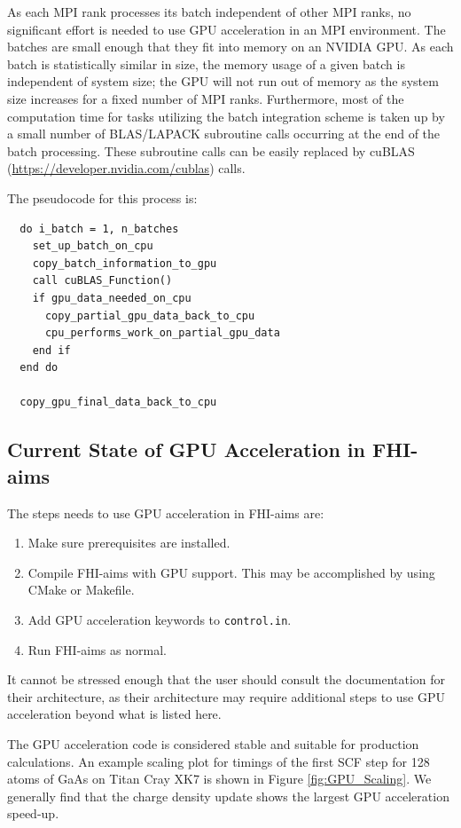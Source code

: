 As each MPI rank processes its batch independent of other MPI ranks, no significant effort is needed to use GPU acceleration in an MPI environment. The batches are small enough that they fit into memory on an NVIDIA GPU. As each batch is statistically similar in size, the memory usage of a given batch is independent of system size; the GPU will not run out of memory as the system size increases for a fixed number of MPI ranks. Furthermore, most of the computation time for tasks utilizing the batch integration scheme is taken up by a small number of BLAS/LAPACK subroutine calls occurring at the end of the batch processing. These subroutine calls can be easily replaced by cuBLAS (\url{https://developer.nvidia.com/cublas}) calls.

The pseudocode for this process is:
\begin{verbatim}
  do i_batch = 1, n_batches
    set_up_batch_on_cpu
    copy_batch_information_to_gpu
    call cuBLAS_Function()
    if gpu_data_needed_on_cpu
      copy_partial_gpu_data_back_to_cpu
      cpu_performs_work_on_partial_gpu_data
    end if
  end do

  copy_gpu_final_data_back_to_cpu
\end{verbatim}

\subsection{Current State of GPU Acceleration in FHI-aims}

The steps needs to use GPU acceleration in FHI-aims are:
\begin{enumerate}
\item Make sure prerequisites are installed.
\item Compile FHI-aims with GPU support. This may be accomplished by using CMake or Makefile.
\item Add GPU acceleration keywords to \texttt{control.in}.
\item Run FHI-aims as normal.
\end{enumerate}

It cannot be stressed enough that the user should consult the documentation for their architecture, as their architecture may require additional steps to use GPU acceleration beyond what is listed here.

The GPU acceleration code is considered stable and suitable for production calculations. An example scaling plot for timings of the first SCF step for 128 atoms of GaAs on Titan Cray XK7 is shown in Figure \ref{fig:GPU_Scaling}. We generally find that the charge density update shows the largest GPU acceleration speed-up.

